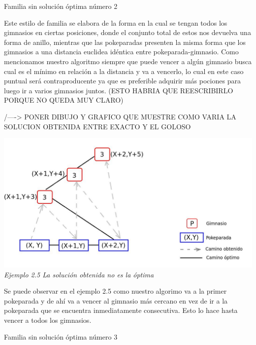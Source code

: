 \begin{center}
Familia sin soluci\'on \'optima n\'umero 2
\end{center}

Este estilo de familia se elabora de la forma en la cual se tengan todos los gimnasios en ciertas posiciones, donde el conjunto total de estos nos devuelva una forma de anillo, mientras que las pokeparadas presenten la misma forma que los gimnasios a una distancia euclidea id\'entica entre pokeparada-gimnasio. Como mencionamos nuestro algoritmo siempre que puede vencer a alg\'un gimnasio busca cual es el m\'inimo en relaci\'on a la distancia y va a vencerlo, lo cual en este caso puntual ser\'a contraproducente ya que es preferible adquirir m\'as pociones para luego ir a varios gimnasios juntos. (ESTO HABRIA QUE REESCRIBIRLO PORQUE NO QUEDA MUY CLARO)


/----> PONER DIBUJO Y GRAFICO QUE MUESTRE COMO VARIA LA SOLUCION OBTENIDA ENTRE EXACTO Y EL GOLOSO 

\vspace*{0.3cm} \vspace*{0.3cm}
  \begin{center}
\includegraphics[scale=0.60]{./EJ2/nooptima.jpeg}
\\{\textit{Ejemplo 2.5 La soluci\'on obtenida no es la \'optima}}
  \end{center}
  \vspace*{0.3cm}

Se puede observar en el ejemplo 2.5 como nuestro algorimo va a la primer pokeparada y de ah\'i va a vencer al gimnasio m\'as cercano en vez de ir a la pokeparada que se encuentra inmediatamente consecutiva. Esto lo hace hasta vencer a todos los gimnasios.

\begin{center}
Familia sin soluci\'on \'optima n\'umero 3
\end{center}

